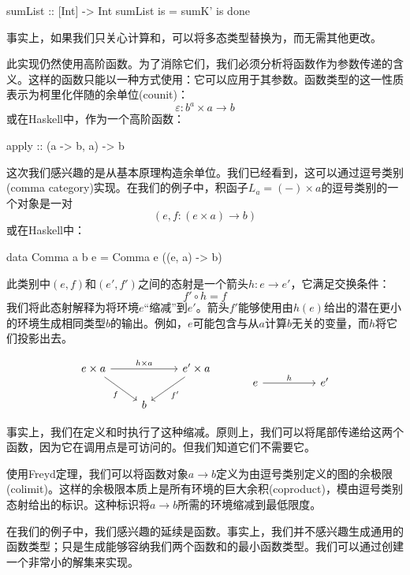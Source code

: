 \documentclass[DaoFP]{subfiles}
\begin{document}
\begin{haskell}
sumList :: [Int] -> Int
sumList is = sumK' is done
\end{haskell}

事实上，如果我们只关心计算和，可以将多态类型替换为，而无需其他更改。

此实现仍然使用高阶函数。为了消除它们，我们必须分析将函数作为参数传递的含义。这样的函数只能以一种方式使用：它可以应用于其参数。函数类型的这一性质表示为柯里化伴随的余单位(counit)：
\[ \varepsilon \colon b^a \times a \to b \]
或在Haskell中，作为一个高阶函数：
\begin{haskell}
apply :: (a -> b, a) -> b
\end{haskell}
这次我们感兴趣的是从基本原理构造余单位。我们已经看到，这可以通过逗号类别(comma category)实现。在我们的例子中，积函子$L_a = (-) \times a$的逗号类别的一个对象是一对
\[(e, f \colon (e \times a) \to b) \]
或在Haskell中：
\begin{haskell}
data Comma a b e = Comma e ((e, a) -> b)
\end{haskell}
此类别中$(e, f)$和$(e', f')$之间的态射是一个箭头$h \colon e \to e'$，它满足交换条件：
\[ f' \circ h = f \]
我们将此态射解释为将环境$e$“缩减”到$e'$。箭头$f'$能够使用由$h (e)$给出的潜在更小的环境生成相同类型$b$的输出。例如，$e$可能包含与从$a$计算$b$无关的变量，而$h$将它们投影出去。

\[
 \begin{tikzcd}
 e \times a
 \arrow[rd, "f"']
 \arrow[rr, "h \times a"]
 && e' \times a
 \arrow[ld, "f'"]
 \\
 &b
  \end{tikzcd}
 \hspace{30pt}
\begin{tikzcd}
 e
 \arrow[rr, "h"]
 && e'
  \end{tikzcd}
\]

事实上，我们在定义和时执行了这种缩减。原则上，我们可以将尾部传递给这两个函数，因为它在调用点是可访问的。但我们知道它们不需要它。

使用Freyd定理，我们可以将函数对象$a \to b$定义为由逗号类别定义的图的余极限(colimit)。这样的余极限本质上是所有环境的巨大余积(coproduct)，模由逗号类别态射给出的标识。这种标识将$a \to b$所需的环境缩减到最低限度。

在我们的例子中，我们感兴趣的延续是函数。事实上，我们并不感兴趣生成通用的函数类型；只是生成能够容纳我们两个函数和的最小函数类型。我们可以通过创建一个非常小的解集来实现。
\end{document}
